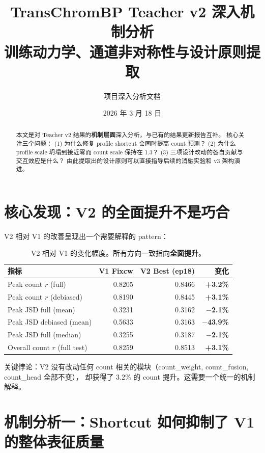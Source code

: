 \documentclass[11pt,a4paper]{ctexart}
\title{TransChromBP Teacher v2 深入机制分析\\
\large 训练动力学、通道非对称性与设计原则提取}
\author{项目深入分析文档}
\date{2026 年 3 月 18 日}
\newcommand{\good}[1]{\textcolor{goodgreen}{\textbf{#1}}}
\begin{document}
\maketitle

\begin{abstract}
本文是对 Teacher v2 结果的\textbf{机制层面}深入分析，与已有的结果更新报告互补。
核心关注三个问题：
(1) 为什么修复 profile shortcut 会同时提高 count 预测？
(2) 为什么 profile scale 坍塌到接近零而 count scale 保持在 1.3？
(3) 三项设计改动的各自贡献与交互效应是什么？
由此提取出的设计原则可以直接指导后续的消融实验和 v3 架构演进。
\end{abstract}

\tableofcontents
\newpage

\section{核心发现：V2 的全面提升不是巧合}

V2 相对 V1 的改善呈现出一个需要解释的 pattern：

\begin{table}[H]
\centering
\small
\caption{V2 相对 V1 的变化幅度。所有方向一致指向\textbf{全面提升}。}
\begin{tabular}{lrrr}
\toprule
指标 & V1 Fixcw & V2 Best (ep18) & 变化 \\
\midrule
Peak count $r$ (full) & 0.8205 & 0.8466 & \good{+3.2\%} \\
Peak count $r$ (debiased) & 0.8190 & 0.8445 & \good{+3.1\%} \\
Peak JSD full (mean) & 0.3231 & 0.3162 & \good{$-$2.1\%} \\
Peak JSD debiased (mean) & 0.5633 & 0.3163 & \good{$-$43.9\%} \\
Peak JSD full (median) & 0.3255 & 0.3187 & \good{$-$2.1\%} \\
Overall count $r$ (full test) & 0.8259 & 0.8513 & \good{+3.1\%} \\
\bottomrule
\end{tabular}
\end{table}

关键悖论：V2 没有改动任何 count 相关的模块（count\_weight, count\_fusion, count\_head 全部不变），
却获得了 3.2\% 的 count 提升。这需要一个统一的机制解释。

\section{机制分析一：Shortcut 如何抑制了 V1 的整体表征质量}
\end{document}
